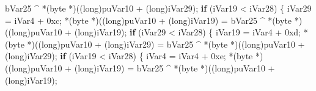 \documentclass[
]{article}
\newenvironment{Shaded}{}{}
\newcommand{\BaseNTok}[1]{\textcolor[rgb]{0.25,0.63,0.44}{#1}}
\newcommand{\ControlFlowTok}[1]{\textcolor[rgb]{0.00,0.44,0.13}{\textbf{#1}}}
\newcommand{\DataTypeTok}[1]{\textcolor[rgb]{0.56,0.13,0.00}{#1}}
\newcommand{\NormalTok}[1]{#1}
\newcommand{\OperatorTok}[1]{\textcolor[rgb]{0.40,0.40,0.40}{#1}}
\begin{document}
\begin{Shaded}
\begin{Highlighting}[]
\NormalTok{                             bVar25 }\OperatorTok{\^{}} \OperatorTok{*(}\NormalTok{byte }\OperatorTok{*)((}\DataTypeTok{long}\OperatorTok{)}\NormalTok{puVar10 }\OperatorTok{+} \OperatorTok{(}\DataTypeTok{long}\OperatorTok{)}\NormalTok{iVar29}\OperatorTok{);}
                        \ControlFlowTok{if} \OperatorTok{(}\NormalTok{iVar19 }\OperatorTok{\textless{}}\NormalTok{ iVar28}\OperatorTok{)} \OperatorTok{\{}
\NormalTok{                          iVar29 }\OperatorTok{=}\NormalTok{ iVar4 }\OperatorTok{+} \BaseNTok{0xc}\OperatorTok{;}
                          \OperatorTok{*(}\NormalTok{byte }\OperatorTok{*)((}\DataTypeTok{long}\OperatorTok{)}\NormalTok{puVar10 }\OperatorTok{+} \OperatorTok{(}\DataTypeTok{long}\OperatorTok{)}\NormalTok{iVar19}\OperatorTok{)} \OperatorTok{=}
\NormalTok{                               bVar25 }\OperatorTok{\^{}} \OperatorTok{*(}\NormalTok{byte }\OperatorTok{*)((}\DataTypeTok{long}\OperatorTok{)}\NormalTok{puVar10 }\OperatorTok{+} \OperatorTok{(}\DataTypeTok{long}\OperatorTok{)}\NormalTok{iVar19}\OperatorTok{);}
                          \ControlFlowTok{if} \OperatorTok{(}\NormalTok{iVar29 }\OperatorTok{\textless{}}\NormalTok{ iVar28}\OperatorTok{)} \OperatorTok{\{}
\NormalTok{                            iVar19 }\OperatorTok{=}\NormalTok{ iVar4 }\OperatorTok{+} \BaseNTok{0xd}\OperatorTok{;}
                            \OperatorTok{*(}\NormalTok{byte }\OperatorTok{*)((}\DataTypeTok{long}\OperatorTok{)}\NormalTok{puVar10 }\OperatorTok{+} \OperatorTok{(}\DataTypeTok{long}\OperatorTok{)}\NormalTok{iVar29}\OperatorTok{)} \OperatorTok{=}
\NormalTok{                                 bVar25 }\OperatorTok{\^{}} \OperatorTok{*(}\NormalTok{byte }\OperatorTok{*)((}\DataTypeTok{long}\OperatorTok{)}\NormalTok{puVar10 }\OperatorTok{+} \OperatorTok{(}\DataTypeTok{long}\OperatorTok{)}\NormalTok{iVar29}\OperatorTok{);}
                            \ControlFlowTok{if} \OperatorTok{(}\NormalTok{iVar19 }\OperatorTok{\textless{}}\NormalTok{ iVar28}\OperatorTok{)} \OperatorTok{\{}
\NormalTok{                              iVar4 }\OperatorTok{=}\NormalTok{ iVar4 }\OperatorTok{+} \BaseNTok{0xe}\OperatorTok{;}
                              \OperatorTok{*(}\NormalTok{byte }\OperatorTok{*)((}\DataTypeTok{long}\OperatorTok{)}\NormalTok{puVar10 }\OperatorTok{+} \OperatorTok{(}\DataTypeTok{long}\OperatorTok{)}\NormalTok{iVar19}\OperatorTok{)} \OperatorTok{=}
\NormalTok{                                   bVar25 }\OperatorTok{\^{}} \OperatorTok{*(}\NormalTok{byte }\OperatorTok{*)((}\DataTypeTok{long}\OperatorTok{)}\NormalTok{puVar10 }\OperatorTok{+} \OperatorTok{(}\DataTypeTok{long}\OperatorTok{)}\NormalTok{iVar19}\OperatorTok{);}

\end{Highlighting}
\end{Shaded}
\end{document}
